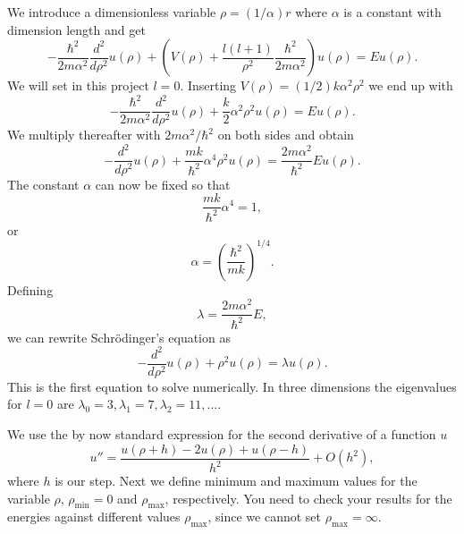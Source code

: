 \begin{prob}
We introduce a dimensionless variable $\rho = (1/\alpha) r$
where $\alpha$ is a constant with dimension length and get
% 
\[
  -\frac{\hbar^2}{2 m \alpha^2} \frac{d^2}{d\rho^2} u(\rho) 
       + \left ( V(\rho) + \frac{l (l + 1)}{\rho^2}
         \frac{\hbar^2}{2 m\alpha^2} \right ) u(\rho)  = E u(\rho) .
\]
%
We will set in this project $l=0$.
Inserting $V(\rho) = (1/2) k \alpha^2\rho^2$ we end up with
\[
  -\frac{\hbar^2}{2 m \alpha^2} \frac{d^2}{d\rho^2} u(\rho) 
       + \frac{k}{2} \alpha^2\rho^2u(\rho)  = E u(\rho) .
\]
We multiply thereafter with $2m\alpha^2/\hbar^2$ on both sides and obtain
\[
  -\frac{d^2}{d\rho^2} u(\rho) 
       + \frac{mk}{\hbar^2} \alpha^4\rho^2u(\rho)  = \frac{2m\alpha^2}{\hbar^2}E u(\rho) .
\]
The constant $\alpha$ can now be fixed
so that
\[
\frac{mk}{\hbar^2} \alpha^4 = 1,
\]
or 
\[
\alpha = \left(\frac{\hbar^2}{mk}\right)^{1/4}.
\]
Defining 
\[
\lambda = \frac{2m\alpha^2}{\hbar^2}E,
\]
we can rewrite Schr\"odinger's equation as
\[
  -\frac{d^2}{d\rho^2} u(\rho) + \rho^2u(\rho)  = \lambda u(\rho) .
\]
This is the first equation to solve numerically. In three dimensions 
the eigenvalues for $l=0$ are 
$\lambda_0=3,\lambda_1=7,\lambda_2=11,\dots .$

We use the by now standard
expression for the second derivative of a function $u$
\[
    u''=\frac{u(\rho+h) -2u(\rho) +u(\rho-h)}{h^2} +O(h^2),
\]
where $h$ is our step.
Next we define minimum and maximum values for the variable $\rho$,
$\rho_{\mathrm{min}}=0$  and $\rho_{\mathrm{max}}$, respectively.
You need to check your results for the energies against different values
$\rho_{\mathrm{max}}$, since we cannot set
$\rho_{\mathrm{max}}=\infty$. 


\end{prob}
